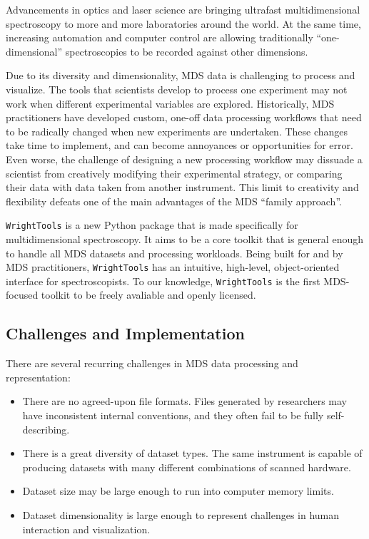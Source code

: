Advancements in optics and laser science are bringing ultrafast
multidimensional spectroscopy to more and more laboratories around the
world. At the same time, increasing automation and computer control are
allowing traditionally ``one-dimensional'' spectroscopies to be recorded
against other dimensions.

Due to its diversity and dimensionality, MDS data is challenging to
process and visualize. The tools that scientists develop to process one
experiment may not work when different experimental variables are
explored. Historically, MDS practitioners have developed custom, one-off
data processing workflows that need to be radically changed when new
experiments are undertaken. These changes take time to implement, and
can become annoyances or opportunities for error. Even worse, the
challenge of designing a new processing workflow may dissuade a
scientist from creatively modifying their experimental strategy, or
comparing their data with data taken from another instrument. This limit
to creativity and flexibility defeats one of the main advantages of the
MDS ``family approach''.

\texttt{WrightTools} is a new Python package that is made specifically
for multidimensional spectroscopy. It aims to be a core toolkit that is
general enough to handle all MDS datasets and processing workloads.
Being built for and by MDS practitioners, \texttt{WrightTools} has an
intuitive, high-level, object-oriented interface for spectroscopists. To
our knowledge, \texttt{WrightTools} is the first MDS-focused toolkit to
be freely avaliable and openly licensed.

\hypertarget{challenges-and-implementation}{%
\subsection{Challenges and
Implementation}\label{challenges-and-implementation}}

There are several recurring challenges in MDS data processing and
representation:

\begin{itemize}
\item
  There are no agreed-upon file formats. Files generated by researchers
  may have inconsistent internal conventions, and they often fail to be
  fully self-describing.
\item
  There is a great diversity of dataset types. The same instrument is
  capable of producing datasets with many different combinations of
  scanned hardware.
\item
  Dataset size may be large enough to run into computer memory limits.
\item
  Dataset dimensionality is large enough to represent challenges in
  human interaction and visualization.
\end{itemize}

